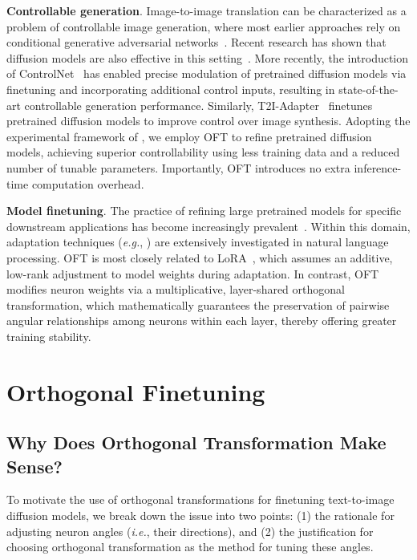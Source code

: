 \textbf{Controllable generation}. Image-to-image translation can be characterized as a problem of controllable image generation, where most earlier approaches rely on conditional generative adversarial networks~\cite{isola2017image,zhu2017toward,wang2018high,park2019semantic,choi2018stargan}. Recent research has shown that diffusion models are also effective in this setting~\cite{saharia2022palette,voynov2022sketch,wang2022pretraining}. More recently, the introduction of ControlNet~\cite{zhang2023adding} has enabled precise modulation of pretrained diffusion models via finetuning and incorporating additional control inputs, resulting in state-of-the-art controllable generation performance. Similarly, T2I-Adapter~\cite{mou2023t2i} finetunes pretrained diffusion models to improve control over image synthesis. Adopting the experimental framework of \cite{zhang2023adding,mou2023t2i}, we employ OFT to refine pretrained diffusion models, achieving superior controllability using less training data and a reduced number of tunable parameters. Importantly, OFT introduces no extra inference-time computation overhead.

\textbf{Model finetuning}. The practice of refining large pretrained models for specific downstream applications has become increasingly prevalent~\cite{devlin2018bert,brown2020language,he2022masked}. Within this domain, adaptation techniques (\emph{e.g.}, \cite{hulora2022,houlsby2019parameter,pfeiffer2020adapterfusion}) are extensively investigated in natural language processing. OFT is most closely related to LoRA~\cite{hulora2022}, which assumes an additive, low-rank adjustment to model weights during adaptation. In contrast, OFT modifies neuron weights via a multiplicative, layer-shared orthogonal transformation, which mathematically guarantees the preservation of pairwise angular relationships among neurons within each layer, thereby offering greater training stability.

\section{Orthogonal Finetuning}

\subsection{Why Does Orthogonal Transformation Make Sense?}

To motivate the use of orthogonal transformations for finetuning text-to-image diffusion models, we break down the issue into two points: (1) the rationale for adjusting neuron angles (\emph{i.e.}, their directions), and (2) the justification for choosing orthogonal transformation as the method for tuning these angles.

